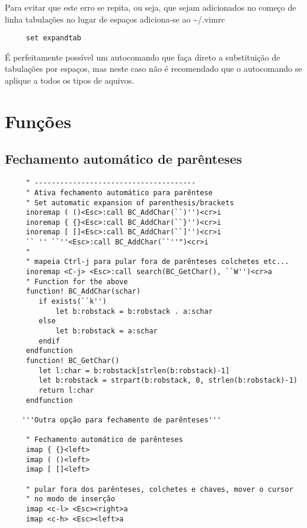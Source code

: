 Para evitar que este erro se repita, ou seja, que sejam 
adicionados no começo de linha tabulações no lugar de espaços
adiciona-se ao \textasciitilde/.vimrc

\begin{verbatim}
     set expandtab
\end{verbatim}

É perfeitamente possível um autocomando que faça direto a substituição de
tabulações por espaços, mas neste caso não é recomendado que o autocomando se
aplique a todos os tipos de aquivos.

\section{Funções}
\label{sec:Funções}

\subsection{Fechamento automático de parênteses}
\label{sec:Fechamento automático de parênteses}

\begin{verbatim}
     " --------------------------------------
     " Ativa fechamento automático para parêntese
     " Set automatic expansion of parenthesis/brackets
     inoremap ( ()<Esc>:call BC_AddChar(``)'')<cr>i
     inoremap { {}<Esc>:call BC_AddChar(``}'')<cr>i
     inoremap [ []<Esc>:call BC_AddChar(``]'')<cr>i
     `` '' ``''<Esc>:call BC_AddChar(``''")<cr>i
     "
     " mapeia Ctrl-j para pular fora de parênteses colchetes etc...
     inoremap <C-j> <Esc>:call search(BC_GetChar(), ``W'')<cr>a
     " Function for the above
     function! BC_AddChar(schar)
        if exists(``k'')
            let b:robstack = b:robstack . a:schar
        else
            let b:robstack = a:schar
        endif
     endfunction
     function! BC_GetChar()
        let l:char = b:robstack[strlen(b:robstack)-1]
        let b:robstack = strpart(b:robstack, 0, strlen(b:robstack)-1)
        return l:char
     endfunction
    
    '''Outra opção para fechamento de parênteses'''
    
     " Fechamento automático de parênteses
     imap { {}<left>
     imap ( ()<left>
     imap [ []<left>
    
     " pular fora dos parênteses, colchetes e chaves, mover o cursor
     " no modo de inserção
     imap <c-l> <Esc><right>a
     imap <c-h> <Esc><left>a
\end{verbatim}

